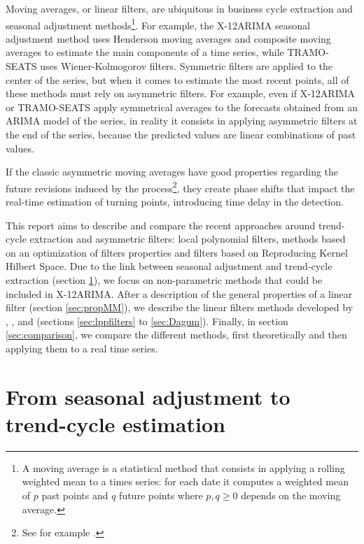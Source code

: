 \documentclass[
  12pt,
  ,
  a4paper]{article}
\newcommand\1{\mathds{1}}
\begin{document}
Moving averages, or linear filters, are ubiquitous in business cycle extraction and seasonal adjustment methods\footnote{A moving average is a statistical method that consists in applying a rolling weighted mean to a times series: for each date it computes a weighted mean of \(p\) past points and \(q\) future points where \(p,q\geq0\) depends on the moving average.}.
For example, the X-12ARIMA seasonal adjustment method uses Henderson moving averages and composite moving averages to estimate the main components of a time series, while TRAMO-SEATS uses Wiener-Kolmogorov filters.
Symmetric filters are applied to the center of the series, but when it comes to estimate the most recent points, all of these methods must rely on asymmetric filters.
For example, even if X-12ARIMA or TRAMO-SEATS apply symmetrical averages to the forecasts obtained from an ARIMA model of the series, in reality it consists in applying asymmetric filters at the end of the series, because the predicted values are linear combinations of past values.

If the classic asymmetric moving averages have good properties regarding the future revisions induced by the process\footnote{See for example \textcite{pierce1980SA}.}, they create phase shifts that impact the real-time estimation of turning points, introducing time delay in the detection.

This report aims to describe and compare the recent approaches around trend-cycle extraction and asymmetric filters: local polynomial filters, methods based on an optimization of filters properties and filters based on Reproducing Kernel Hilbert Space.
Due to the link between seasonal adjustment and trend-cycle extraction (section \ref{sec:SAtoTCE}), we focus on non-parametric methods that could be included in X-12ARIMA.
After a description of the general properties of a linear filter (section \ref{sec:propMM}), we describe the linear filters methods developed by \textcite{proietti2008}, \textcite{ch15HBSA}, \textcite{trilemmaWMR2019} and \textcite{dagumbianconcini2008} (sections \ref{sec:lppfilters} to \ref{sec:Dagum}).
Finally, in section \ref{sec:comparison}, we compare the different methods, first theoretically and then applying them to a real time series.

\newpage

\hypertarget{sec:SAtoTCE}{%
\section{From seasonal adjustment to trend-cycle estimation}\label{sec:SAtoTCE}}
\end{document}
